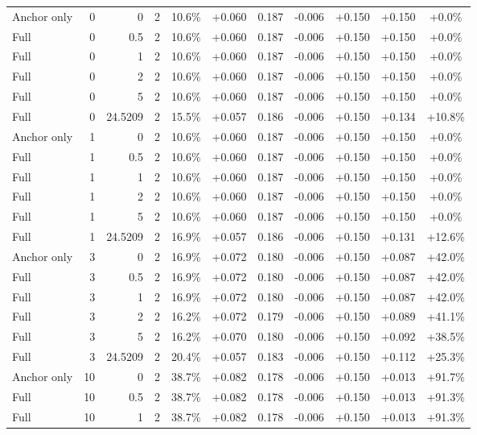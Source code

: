 \begin{table}[htbp]
\begin{tabular}{lrrrccccccc}
Anchor only & 0 & 0 & 2 & 10.6\% & +0.060 & 0.187 & -0.006 & +0.150 & +0.150 & +0.0\% \\
Full & 0 & 0.5 & 2 & 10.6\% & +0.060 & 0.187 & -0.006 & +0.150 & +0.150 & +0.0\% \\
Full & 0 & 1 & 2 & 10.6\% & +0.060 & 0.187 & -0.006 & +0.150 & +0.150 & +0.0\% \\
Full & 0 & 2 & 2 & 10.6\% & +0.060 & 0.187 & -0.006 & +0.150 & +0.150 & +0.0\% \\
Full & 0 & 5 & 2 & 10.6\% & +0.060 & 0.187 & -0.006 & +0.150 & +0.150 & +0.0\% \\
Full & 0 & 24.5209 & 2 & 15.5\% & +0.057 & 0.186 & -0.006 & +0.150 & +0.134 & +10.8\% \\
Anchor only & 1 & 0 & 2 & 10.6\% & +0.060 & 0.187 & -0.006 & +0.150 & +0.150 & +0.0\% \\
Full & 1 & 0.5 & 2 & 10.6\% & +0.060 & 0.187 & -0.006 & +0.150 & +0.150 & +0.0\% \\
Full & 1 & 1 & 2 & 10.6\% & +0.060 & 0.187 & -0.006 & +0.150 & +0.150 & +0.0\% \\
Full & 1 & 2 & 2 & 10.6\% & +0.060 & 0.187 & -0.006 & +0.150 & +0.150 & +0.0\% \\
Full & 1 & 5 & 2 & 10.6\% & +0.060 & 0.187 & -0.006 & +0.150 & +0.150 & +0.0\% \\
Full & 1 & 24.5209 & 2 & 16.9\% & +0.057 & 0.186 & -0.006 & +0.150 & +0.131 & +12.6\% \\
Anchor only & 3 & 0 & 2 & 16.9\% & +0.072 & 0.180 & -0.006 & +0.150 & +0.087 & +42.0\% \\
Full & 3 & 0.5 & 2 & 16.9\% & +0.072 & 0.180 & -0.006 & +0.150 & +0.087 & +42.0\% \\
Full & 3 & 1 & 2 & 16.9\% & +0.072 & 0.180 & -0.006 & +0.150 & +0.087 & +42.0\% \\
Full & 3 & 2 & 2 & 16.2\% & +0.072 & 0.179 & -0.006 & +0.150 & +0.089 & +41.1\% \\
Full & 3 & 5 & 2 & 16.2\% & +0.070 & 0.180 & -0.006 & +0.150 & +0.092 & +38.5\% \\
Full & 3 & 24.5209 & 2 & 20.4\% & +0.057 & 0.183 & -0.006 & +0.150 & +0.112 & +25.3\% \\
Anchor only & 10 & 0 & 2 & 38.7\% & +0.082 & 0.178 & -0.006 & +0.150 & +0.013 & +91.7\% \\
Full & 10 & 0.5 & 2 & 38.7\% & +0.082 & 0.178 & -0.006 & +0.150 & +0.013 & +91.3\% \\
Full & 10 & 1 & 2 & 38.7\% & +0.082 & 0.178 & -0.006 & +0.150 & +0.013 & +91.3\% \\

\end{tabular}
\end{table}
